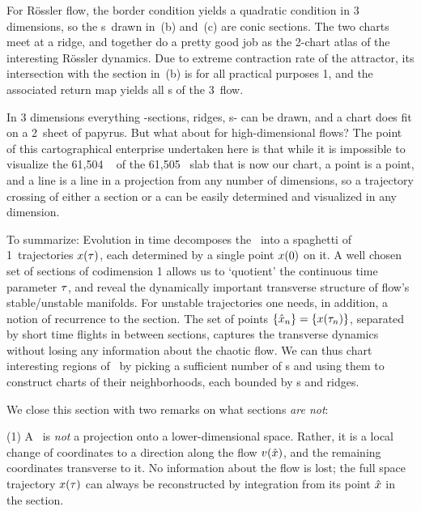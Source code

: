 \documentclass[aip,cha,reprint,
secnumarabic,
nofootinbib, tightenlines,
nobibnotes, showkeys, showpacs,
groupedaddress
]{revtex4-1}
\begin{document}
For R\"ossler flow, the border condition  yields a
quadratic condition in 3 dimensions, so the \poincBord s\ drawn in
\,(b) and \,(c) are conic
sections. The two charts meet at a ridge, and together do a pretty good
job as the 2-chart atlas of the interesting R\"ossler dynamics. Due to
extreme contraction rate of the attractor, its intersection with
the section in
\,(b) is for all practical purposes 1\dmn, and the
associated return map yields all \po s of the 3\dmn\ flow.

In 3 dimensions everything -sections, ridges, \poincBord s- can be
drawn, and a chart does fit on a 2\dmn\ sheet of
papyrus. But what about for high-dimensional flows? The point of this
cartographical enterprise undertaken here is that while it is impossible to
visualize the 61,504%
\dmn\ {\poincBord} of the 61,505%
\dmn\ slab that is now our chart, a point is a point,
and a line is a line in a projection from any number of dimensions, so a
trajectory crossing of either a section or a {\poincBord} can be easily
determined and visualized in any dimension.

To summarize:
Evolution in time decomposes the \statesp\ into a spaghetti of 1\dmn\
trajectories $x(\tau)$, each determined by a single point $x(0)$
on it. A well chosen set of {sections} of codimension 1 allows us to
`quotient' the continuous time parameter $\tau$, and reveal the
dynamically important transverse structure of flow's stable/unstable
manifolds. For unstable trajectories one needs, in addition, a notion of
recurrence to the section. The set of points $\{\hat{x}_n\} =
\{x(\tau_n)\}$,  separated by short time flights in between sections,
captures the transverse dynamics without losing any information about the
chaotic flow. We can thus chart interesting regions of \statesp\ by
picking a sufficient number of \template s and using them to construct
charts of their neighborhoods, each bounded by \poincBord s and ridges.

We close this section with two remarks on what sections \emph{are not}:

(1) A \PoincSec\ is {\em not} a projection onto a lower-dimensional
space. Rather, it is a local change of coordinates to a direction along
the flow $v(\hat{x})$, and the remaining coordinates transverse to it.
No information about the flow is lost; the full space trajectory
$x(\tau)$ can always be reconstructed by integration from its point
$\hat{x}$ in the section.
\end{document}
